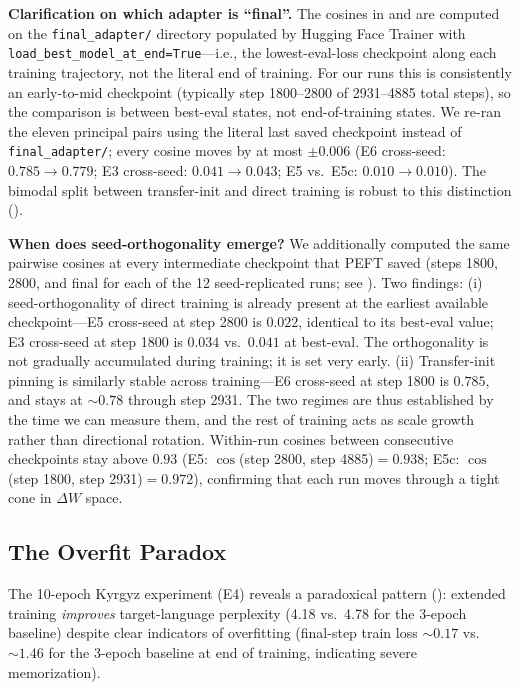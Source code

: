 \documentclass[11pt]{article}
\begin{document}
\textbf{Clarification on which adapter is ``final''.} The cosines in  and  are computed on the \texttt{final\_adapter/} directory populated by Hugging Face Trainer with \texttt{load\_best\_model\_at\_end=True}---i.e., the lowest-eval-loss checkpoint along each training trajectory, not the literal end of training. For our runs this is consistently an early-to-mid checkpoint (typically step 1800--2800 of 2931--4885 total steps), so the comparison is between best-eval states, not end-of-training states. We re-ran the eleven principal pairs using the literal last saved checkpoint instead of \texttt{final\_adapter/}; every cosine moves by at most $\pm 0.006$ (E6 cross-seed: $0.785 \to 0.779$; E3 cross-seed: $0.041 \to 0.043$; E5 vs.\ E5c: $0.010 \to 0.010$). The bimodal split between transfer-init and direct training is robust to this distinction ().

\textbf{When does seed-orthogonality emerge?} We additionally computed the same pairwise cosines at every intermediate checkpoint that PEFT saved (steps 1800, 2800, and final for each of the 12 seed-replicated runs; see ). Two findings: (i) seed-orthogonality of direct training is already present at the earliest available checkpoint---E5 cross-seed at step 2800 is $0.022$, identical to its best-eval value; E3 cross-seed at step 1800 is $0.034$ vs.\ $0.041$ at best-eval. The orthogonality is not gradually accumulated during training; it is set very early. (ii) Transfer-init pinning is similarly stable across training---E6 cross-seed at step 1800 is $0.785$, and stays at $\sim 0.78$ through step 2931. The two regimes are thus established by the time we can measure them, and the rest of training acts as scale growth rather than directional rotation. Within-run cosines between consecutive checkpoints stay above $0.93$ (E5: $\cos$(step 2800, step 4885)$=0.938$; E5c: $\cos$(step 1800, step 2931)$=0.972$), confirming that each run moves through a tight cone in $\Delta W$ space.

\subsection{The Overfit Paradox}
\label{sec:overfit}

The 10-epoch Kyrgyz experiment (E4) reveals a paradoxical pattern (): extended training \emph{improves} target-language perplexity (4.18 vs.\ 4.78 for the 3-epoch baseline) despite clear indicators of overfitting (final-step train loss $\sim 0.17$ vs.\ $\sim 1.46$ for the 3-epoch baseline at end of training, indicating severe memorization).
\end{document}
